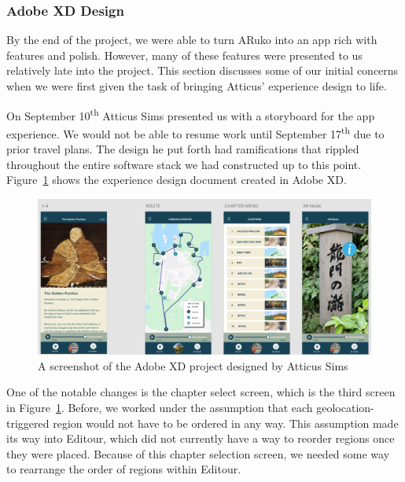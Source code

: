 \documentclass[a4paper, 10pt, american, titlepage]{article}
\begin{document}
\subsubsection{Adobe XD Design}
\label{sec:adobeXdDesign}

By the end of the project, we were able to turn ARuko into an app rich with
features and polish. However, many of these features were presented to us
relatively late into the project. This section discusses some of our initial
concerns when we were first given the task of bringing Atticus' experience
design to life.

On September 10\textsuperscript{th} Atticus Sims presented us with a storyboard
for the app experience. We would not be able to resume work until September
17\textsuperscript{th} due to prior travel plans. The design he put forth had
ramifications that rippled throughout the entire software stack we had
constructed up to this point.  Figure~\ref{fig:adobeXdDesign} shows the experience
design document created in Adobe XD.

\begin{figure}[h]
	\centering
	\includegraphics[width=1\textwidth]{adobe-xd-design.png}
	\caption[A screenshot of the Adobe XD project designed by Atticus Sims]
    {A screenshot of the Adobe XD project designed by Atticus Sims}
	\label{fig:adobeXdDesign}
\end{figure}

One of the notable changes is the chapter select screen, which is the third
screen in Figure~\ref{fig:adobeXdDesign}. Before, we worked under the assumption
that each geolocation-triggered region would not have to be ordered in any way.
This assumption made its way into Editour, which did not currently have a way
to reorder regions once they were placed. Because of this chapter selection
screen, we needed some way to rearrange the order of regions within Editour.
\end{document}
